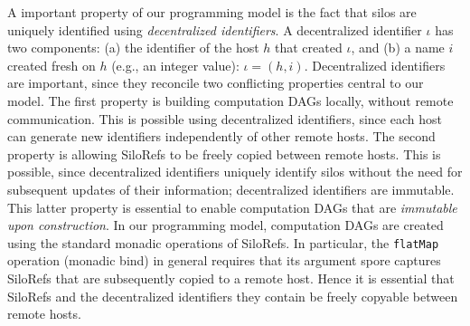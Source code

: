 \documentclass[10pt]{sigplanconf}
\theoremstyle{definition}
\theoremstyle{definition}
\begin{document}
A important property of our programming model is the fact that silos are
uniquely identified using \emph{decentralized identifiers}. A decentralized
identifier $\iota$ has two components: (a) the identifier of the host $h$ that
created $\iota$, and (b) a name $i$ created fresh on $h$ (e.g., an integer
value): $\iota = (h, i)$. Decentralized identifiers are important, since they
reconcile two conflicting properties central to our model. The first property
is building computation DAGs locally, without remote communication. This is
possible using decentralized identifiers, since each host can generate new
identifiers independently of other remote hosts. The second property is
allowing SiloRefs to be freely copied between remote hosts. This is possible,
since decentralized identifiers uniquely identify silos without the need for
subsequent updates of their information; decentralized identifiers are
immutable. This latter property is essential to enable computation DAGs that
are \emph{immutable upon construction}. In our programming model, computation
DAGs are created using the standard monadic operations of SiloRefs. In
particular, the \texttt{flatMap} operation (monadic bind) in general requires
that its argument spore captures SiloRefs that are subsequently copied to a
remote host. Hence it is essential that SiloRefs and the decentralized
identifiers they contain be freely copyable between remote hosts.
\end{document}
